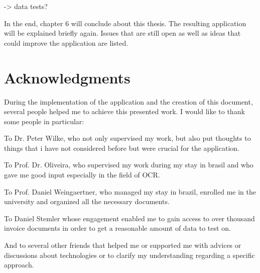 -> data tests?

In the end, chapter 6 will conclude about this thesis. The resulting application will be explained briefly again. Issues that are still open as well as ideas that could improve the application are listed.

\section{Acknowledgments}

During the implementation of the application and the creation of this document, several people helped me to achieve this presented work. I would like to thank some people in particular:

To Dr. Peter Wilke, who not only supervised my work, but also put thoughts to things that i have not considered before but were crucial for the application.

To Prof. Dr. Oliveira, who supervised my work during my stay in brasil and who gave me good input especially in the field of OCR.

To Prof. Daniel Weingaertner, who managed my stay in brazil, enrolled me in the university and organized all the necessary documents.

To Daniel Stemler whose engagement enabled me to gain access to over thousand invoice documents in order to get a reasonable amount of data to test on.

And to several other friends that helped me or supported me with advices or discussions about technologies or to clarify my understanding regarding a specific approach.